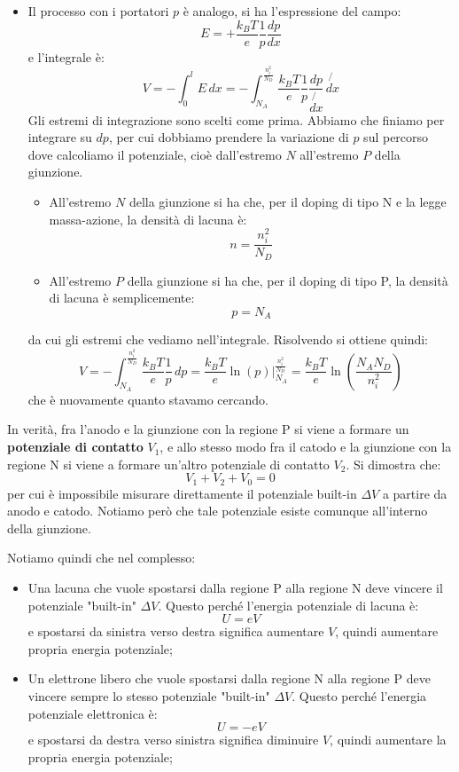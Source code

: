 \documentclass[a4paper,11pt]{article}
\begin{document}
\begin{itemize}
\item Il processo con i portatori $p$ è analogo, si ha l'espressione del campo:
$$
E = +\frac{k_B T}{e} \frac{1}{p} \frac{dp}{dx} 
$$
e l'integrale è:
$$
V = - \int_0^l E \, dx = - \int^{\frac{n_i^2}{N_D}}_{N_A} \frac{k_B T}{e} \frac{1}{p} \frac{dp}{\not{dx}} \, \not{dx}
$$
Gli estremi di integrazione sono scelti come prima. Abbiamo che finiamo per integrare su $dp$, per cui dobbiamo prendere la variazione di $p$ sul percorso dove calcoliamo il potenziale, cioè dall'estremo $N$ all'estremo $P$ della giunzione.
\begin{itemize}
	\item All'estremo $N$ della giunzione si ha che, per il doping di tipo N e la legge massa-azione, la densità di lacuna è:
		$$
		n = \frac{n_i^2}{N_D}
		$$
	\item All'estremo $P$ della giunzione si ha che, per il doping di tipo P, la densità di lacuna è semplicemente:
		$$
		p = N_A
		$$
\end{itemize}
da cui gli estremi che vediamo nell'integrale. Risolvendo si ottiene quindi:
$$
V = - \int^{\frac{n_i^2}{N_D}}_{N_A} \frac{k_B T}{e} \frac{1}{p} \, dp = \frac{k_B T}{e} \ln(p) \Big|^{\frac{n_i^2}{N_D}}_{N_A} =  \frac{k_B T}{e} \ln \left( \frac{N_A N_D}{n_i^2} \right)
$$
che è nuovamente quanto stavamo cercando.

\end{itemize}

In verità, fra l'anodo e la giunzione con la regione P si viene a formare un \textbf{potenziale di contatto} $V_1$, e allo stesso modo fra il catodo e la giunzione con la regione N si viene a formare un'altro potenziale di contatto $V_2$. Si dimostra che:
$$
V_1 + V_2 + V_0 = 0
$$
per cui è impossibile misurare direttamente il potenziale built-in $\Delta V$ a partire da anodo e catodo. Notiamo però che tale potenziale esiste comunque all'interno della giunzione. 

Notiamo quindi che nel complesso:
\begin{itemize}
	\item Una lacuna che vuole spostarsi dalla regione P alla regione N deve vincere il potenziale "built-in" $\Delta V$. Questo perché l'energia potenziale di lacuna è:
		$$
			U = e V
		$$
		e spostarsi da sinistra verso destra significa aumentare $V$, quindi aumentare propria energia potenziale;
	\item Un elettrone libero che vuole spostarsi dalla regione N alla regione P deve vincere sempre lo stesso potenziale "built-in" $\Delta V$. Questo perché l'energia potenziale elettronica è:
		$$
			U = -e V
		$$
		e spostarsi da destra verso sinistra significa diminuire $V$, quindi aumentare la propria energia potenziale;
\end{itemize}
\end{document}
